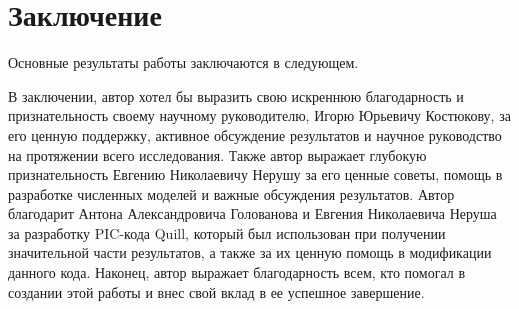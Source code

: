 \chapter*{Заключение}                       %


Основные результаты работы заключаются в следующем.


\vspace{0.25cm}
В заключении, автор хотел бы выразить свою искреннюю благодарность и признательность своему научному руководителю, Игорю Юрьевичу Костюкову, за его ценную поддержку, активное обсуждение результатов и научное руководство на протяжении всего исследования.
Также автор выражает глубокую признательность Евгению Николаевичу Нерушу за его ценные советы, помощь в разработке численных моделей и важные обсуждения результатов. 
Автор благодарит Антона Александровича Голованова и Евгения Николаевича Неруша за разработку PIC-кода Quill, который был использован при получении значительной части результатов, а также за их ценную помощь в модификации данного кода. 
Наконец, автор выражает благодарность всем, кто помогал в создании этой работы и внес свой вклад в ее успешное завершение.